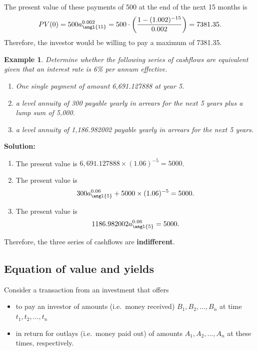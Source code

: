 \documentclass[
]{book}
\theoremstyle{definition}
\theoremstyle{definition}
\newtheorem{example}{Example}[chapter]
\theoremstyle{definition}
\theoremstyle{definition}
\theoremstyle{remark}
\begin{document}
The present value of these payments of 500 at the end of the next 15
months is
\[PV(0) = 500 a^{0.002}_{\angl{15}} =  500 \cdot \left(  \frac{1 - (1.002)^{-15}}{0.002}  \right)   = 7381.35.\]
Therefore, the investor would be willing to pay a maximum of 7381.35.

\begin{example}

\emph{Determine whether the following series of cashflows are equivalent
given that an interest rate is 6\% per annum effective.}

\begin{enumerate}
\def\labelenumi{\arabic{enumi}.}
\item
  \emph{One single payment of amount 6,691.127888 at year 5.}
\item
  \emph{a level annuity of 300 payable yearly in arrears for the next 5
  years plus a lump sum of 5,000.}
\item
  \emph{a level annuity of 1,186.982002 payable yearly in arrears for the
  next 5 years.}
\end{enumerate}

\end{example}

\textbf{Solution:}

\begin{enumerate}
\def\labelenumi{\arabic{enumi}.}
\item
  The present value is \(6,691.127888 \times (1.06)^{-5} = 5000\).
\item
  The present value is
  \[300 a^{0.06}_{\angl{5}}   + 5000 \times (1.06)^{-5}  = 5000.\]
\item
  The present value is \[1186.982002 a^{0.06}_{\angl{5}}     = 5000.\]
\end{enumerate}

Therefore, the three series of cashflows are \textbf{indifferent}.

\subsection{Equation of value and yields}\label{equation-of-value-and-yields}

Consider a transaction from an investment that offers

\begin{itemize}
\item
  to pay an investor of amounts (i.e.~money received)
  \(B_1, B_2, \ldots, B_n\) at time \(t_1, t_2, \ldots ,t_n\)
\item
  in return for outlays (i.e.~money paid out) of amounts
  \(A_1, A_2, \ldots, A_n\) at these times, respectively.
\end{itemize}
\end{document}
